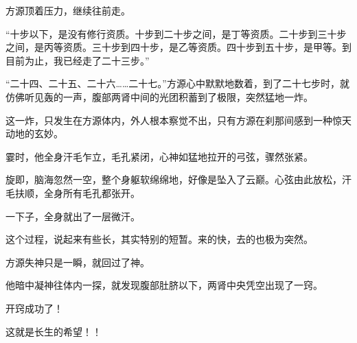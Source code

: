 \begin{this_body}
方源顶着压力，继续往前走。

“十步以下，是没有修行资质。十步到二十步之间，是丁等资质。二十步到三十步之间，是丙等资质。三十步到四十步，是乙等资质。四十步到五十步，是甲等。到目前为止，我已经走了二十三步。”

“二十四、二十五、二十六……二十七。”方源心中默默地数着，到了二十七步时，就仿佛听见轰的一声，腹部两肾中间的光团积蓄到了极限，突然猛地一炸。

这一炸，只发生在方源体内，外人根本察觉不出，只有方源在刹那间感到一种惊天动地的玄妙。

霎时，他全身汗毛乍立，毛孔紧闭，心神如猛地拉开的弓弦，骤然张紧。

旋即，脑海忽然一空，整个身躯软绵绵地，好像是坠入了云巅。心弦由此放松，汗毛扶顺，全身所有毛孔都张开。

一下子，全身就出了一层微汗。

这个过程，说起来有些长，其实特别的短暂。来的快，去的也极为突然。

方源失神只是一瞬，就回过了神。

他暗中凝神往体内一探，就发现腹部肚脐以下，两肾中央凭空出现了一窍。

开窍成功了！

这就是长生的希望！！

\end{this_body}

